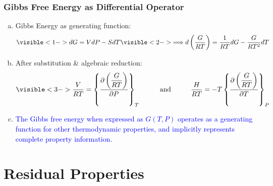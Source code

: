 \documentclass[10pt,compress]{beamer}
\newcommand{\frc}{\displaystyle\frac}
\begin{document}
\begin{frame}
  \frametitle{Gibbs Free Energy as Differential Operator}
     \begin{enumerate}[(a)]
        \item<1-> Gibbs Energy as generating function:
              \begin{displaymath}
                 \visible<1->{dG = VdP - SdT} \visible<2->{\Longrightarrow d\left(\frc{G}{RT}\right) = \frc{1}{RT}dG - \frc{G}{RT^{2}}dT} \nonumber 
              \end{displaymath}

        \item<3-> After substitution $\&$ algebraic reduction:
              \begin{displaymath}
                  \visible<3->{\frc{V}{RT} = \left\{ \frc{\partial\left(\frc{G}{RT}\right)}{\partial P}\right\}_{T} \hspace{1cm}\text{and}\hspace{1cm} \frc{H}{RT} = -T\left\{ \frc{\partial\left(\frc{G}{RT}\right)}{\partial T}\right\}_{P}}
              \end{displaymath}

        \item<4-> \textcolor{blue}{The Gibbs free energy when expressed as $G\left(T,P\right)$ operates as a generating function for other thermodynamic properties, and implicitly represents complete property information.}
     \end{enumerate}

\end{frame}
\normalsize

\section{Residual Properties}
\end{document}

